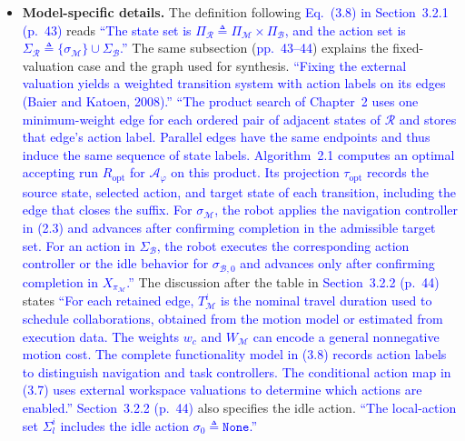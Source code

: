 \documentclass[11pt]{article}
\newcommand{\change}[1]{\textcolor{blue}{#1}}
\begin{document}
\begin{itemize}
\item \textbf{Model-specific details.} The definition following
\change{Eq.~(3.8) in Section~3.2.1 (p.~43)} reads
\change{``The state set is
$\Pi_{\mathcal{R}} \triangleq \Pi_{\mathcal{M}} \times \Pi_{\mathcal{B}}$, and
the action set is
$\Sigma_{\mathcal{R}} \triangleq
\{\sigma_{\mathcal{M}}\} \cup \Sigma_{\mathcal{B}}$.''}
The same subsection (\change{pp.~43--44}) explains the fixed-valuation case
and the graph used for synthesis.
\change{``Fixing the external valuation yields a weighted transition system with
action labels on its edges (Baier and Katoen, 2008).''}
\change{``The product search of Chapter~2 uses one
minimum-weight edge for each ordered pair of adjacent states of $\mathcal{R}$
and stores that edge's action label. Parallel edges have the same endpoints
and thus induce the same sequence of state labels. Algorithm~2.1
computes an optimal accepting run $R_{\text{opt}}$ for $\mathcal{A}_{\varphi}$
on this product.
Its projection $\tau_{\text{opt}}$ records the source state, selected action,
and target state of each transition, including the edge that closes the suffix.
For $\sigma_{\mathcal{M}}$, the robot applies the navigation controller in
(2.3) and advances after confirming completion in the admissible target set.
For an action in $\Sigma_{\mathcal{B}}$, the robot executes the corresponding
action controller or the idle behavior for $\sigma_{\mathcal{B},0}$ and advances
only after confirming completion in $X_{\pi_{\mathcal{M}}}$.''}
The discussion after the table in \change{Section~3.2.2 (p.~44)} states
\change{``For each retained edge, $T_{\mathcal{M}}^i$ is the nominal travel duration
used to schedule collaborations, obtained from the motion model or estimated from
execution data. The weights $w_c$ and $W_{\mathcal{M}}$ can encode a general
nonnegative motion cost. The complete functionality model in
(3.8) records action labels to distinguish navigation and task
controllers. The conditional action map in (3.7) uses external
workspace valuations to determine which actions are enabled.''}
\change{Section~3.2.2 (p.~44)} also specifies the idle action.
\change{``The local-action set $\Sigma_l^i$ includes the idle action
$\sigma_0 \triangleq \texttt{None}$.''}
\end{itemize}
\end{document}
